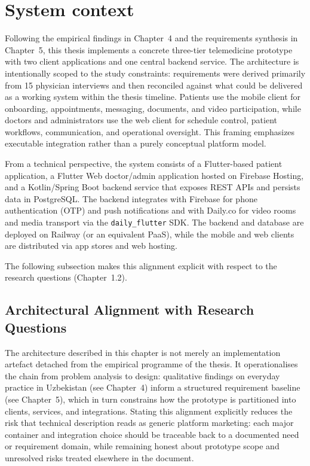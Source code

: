 \documentclass[11pt,a4paper,twoside,openany,headings=normal]{scrreprt}
\begin{document}
\section{System context}

Following the empirical findings in Chapter~4 and the requirements synthesis in Chapter~5, this thesis implements a concrete three-tier telemedicine prototype with two client applications and one central backend service. The architecture is intentionally scoped to the study constraints: requirements were derived primarily from 15 physician interviews and then reconciled against what could be delivered as a working system within the thesis timeline. Patients use the mobile client for onboarding, appointments, messaging, documents, and video participation, while doctors and administrators use the web client for schedule control, patient workflows, communication, and operational oversight. This framing emphasizes executable integration rather than a purely conceptual platform model.

From a technical perspective, the system consists of a Flutter-based patient application, a Flutter Web doctor/admin application hosted on Firebase Hosting, and a Kotlin/Spring Boot backend service that exposes REST APIs and persists data in PostgreSQL. The backend integrates with Firebase for phone authentication (OTP) and push notifications and with Daily.co for video rooms and media transport via the \texttt{daily\_flutter} SDK. The backend and database are deployed on Railway (or an equivalent PaaS), while the mobile and web clients are distributed via app stores and web hosting.

The following subsection makes this alignment explicit with respect to the research questions (Chapter~1.2).

\subsection{Architectural Alignment with Research Questions}

The architecture described in this chapter is not merely an implementation artefact detached from the empirical programme of the thesis. It operationalises the chain from problem analysis to design: qualitative findings on everyday practice in Uzbekistan (see Chapter~4) inform a structured requirement baseline (see Chapter~5), which in turn constrains how the prototype is partitioned into clients, services, and integrations. Stating this alignment explicitly reduces the risk that technical description reads as generic platform marketing: each major container and integration choice should be traceable back to a documented need or requirement domain, while remaining honest about prototype scope and unresolved risks treated elsewhere in the document.
\end{document}
